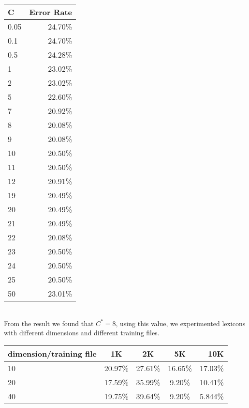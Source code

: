 \documentclass[10pt]{article}
\begin{document}
\begin{enumerate}
\begin{enumerate}
              \begin{tabular}{| l | r |}
                \hline
                C & Error Rate \\ \hline
                0.05 &  24.70\% \\ \hline
                0.1  &  24.70\% \\ \hline
                0.5  &  24.28\%\\ \hline
                1    &   23.02\%\\ \hline
                2    &  23.02\%\\ \hline
                5    &  22.60\%\\ \hline
                7    &  20.92\%\\ \hline
                8   &  20.08\%\\ \hline
                9   &  20.08\%\\ \hline
                10   &  20.50\%\\ \hline
                11   &  20.50\%\\ \hline
                12   &  20.91\%\\ \hline
                19   &  20.49\%\\ \hline
                20   &  20.49\%\\ \hline
                21   &  20.49\%\\ \hline
                22   &  20.08\%\\ \hline
                23   &  20.50\%\\ \hline
                24   &  20.50\%\\ \hline
                25   &  20.50\%\\ \hline
                50   &  23.01\%\\ \hline
              \end{tabular} \\   
              
              From the result we found that $C^* = 8$, using this value, we experimented lexicons with different dimensions and different training files.\\
              
                \begin{tabular}{| l | c | c | c | r |}
                \hline
                dimension/training file  & 1K & 2K & 5K & 10K \\ \hline
                10 & 20.97\% & 27.61\% & 16.65\% & 17.03\%\\ \hline
                20 & 17.59\% & 35.99\% & 9.20\% & 10.41\% \\ \hline
                40 & 19.75\% & 39.64\% & 9.20\% &  5.844\%\\ \hline
              \end{tabular} \\      
              

\end{enumerate}
\end{enumerate}
\end{document}
